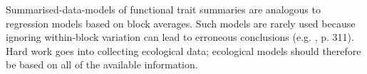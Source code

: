\documentclass[12pt]{ecology}
\begin{document}







Summarised-data-models of functional trait summaries are analogous to regression models based on block averages.  Such models are rarely used because ignoring within-block variation can lead to erroneous conclusions (e.g. , p. 311).  Hard work goes into collecting ecological data; ecological models should therefore be based on all of the available information.




\end{document}
